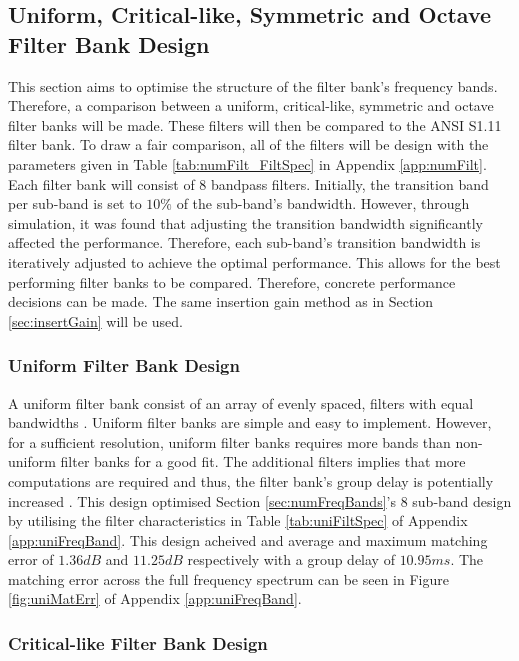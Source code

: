 \documentclass[12pt, onecolumn]{article}
\begin{document}
\subsection{Uniform, Critical-like, Symmetric and Octave Filter Bank Design}
\label{sec:uniCritSymOct}

\noindent This section aims to optimise the structure of the filter bank's frequency bands. Therefore, a comparison between a uniform, critical-like, symmetric and octave filter banks will be made. These filters will then be compared to the ANSI S1.11 filter bank. To draw a fair comparison, all of the filters will be design with the parameters given in Table \ref{tab:numFilt_FiltSpec} in Appendix \ref{app:numFilt}. Each filter bank will consist of $8$ bandpass filters. Initially, the transition band per sub-band is set to $10\%$ of the sub-band's bandwidth. However, through simulation, it was found that adjusting the transition bandwidth significantly affected the performance. Therefore, each sub-band's transition bandwidth is iteratively adjusted to achieve the optimal performance. This allows for the best performing filter banks to be compared. Therefore, concrete performance decisions can be made. The same insertion gain method as in Section \ref{sec:insertGain} will be used.

\subsubsection{Uniform Filter Bank Design}
\label{sec:uniDesign}

\noindent A uniform filter bank consist of an array of evenly spaced, filters with equal bandwidths \cite{chang}. Uniform filter banks are simple and easy to implement. However, for a sufficient resolution, uniform filter banks requires more bands than non-uniform filter banks for a good fit. The additional filters implies that more computations are required and thus, the filter bank's group delay is potentially increased \cite{brennan}. This design optimised  Section \ref{sec:numFreqBands}'s $8$ sub-band design by utilising the filter characteristics in Table \ref{tab:uniFiltSpec} of Appendix \ref{app:uniFreqBand}. This design acheived and average and maximum matching error of $1.36dB$ and $11.25dB$ respectively with a group delay of $10.95ms$. The matching error across the full frequency spectrum can be seen in Figure \ref{fig:uniMatErr} of Appendix \ref{app:uniFreqBand}.


\subsubsection{Critical-like Filter Bank Design}
\label{sec:critDesign}
\end{document}

